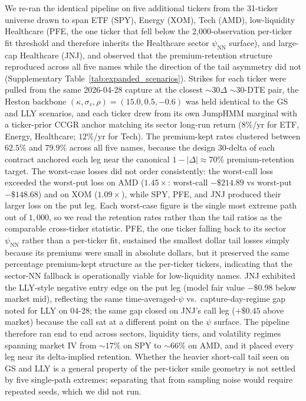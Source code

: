 We re-ran the identical pipeline on five additional tickers from the 31-ticker universe drawn to span ETF (SPY), Energy (XOM), Tech (AMD), low-liquidity Healthcare (PFE, the one ticker that fell below the 2{,}000-observation per-ticker fit threshold and therefore inherits the Healthcare sector $\psi_{\mathrm{NN}}$ surface), and large-cap Healthcare (JNJ), and observed that the premium-retention structure reproduced across all five names while the direction of the tail asymmetry did not (Supplementary Table~\ref{tab:expanded_scenarios}). Strikes for each ticker were pulled from the same 2026-04-28 capture at the closest $\sim 30\Delta$ $\sim$30-DTE pair, the Heston backbone $(\kappa, \sigma_v, \rho) = (15.0, 0.5, -0.6)$ was held identical to the GS and LLY scenarios, and each ticker drew from its own JumpHMM marginal with a ticker-prior CCGR anchor matching its sector long-run return ($8\%$/yr for ETF, Energy, Healthcare; $12\%$/yr for Tech). The premium-kept rates clustered between $62.5\%$ and $79.9\%$ across all five names, because the design 30-delta of each contract anchored each leg near the canonical $1 - |\Delta| \approx 70\%$ premium-retention target. The worst-case losses did not order consistently: the worst-call loss exceeded the worst-put loss on AMD ($1.45{\times}$: worst-call $-\$214.89$ vs worst-put $-\$148.68$) and on XOM ($1.09{\times}$), while SPY, PFE, and JNJ produced their larger loss on the put leg. Each worst-case figure is the single most extreme path out of $1{,}000$, so we read the retention rates rather than the tail ratios as the comparable cross-ticker statistic. PFE, the one ticker falling back to its sector $\psi_{\mathrm{NN}}$ rather than a per-ticker fit, sustained the smallest dollar tail losses simply because its premiums were small in absolute dollars, but it preserved the same percentage premium-kept structure as the per-ticker tickers, indicating that the sector-NN fallback is operationally viable for low-liquidity names. JNJ exhibited the LLY-style negative entry edge on the put leg (model fair value $-\$0.98$ below market mid), reflecting the same time-averaged-$\psi$ vs.\ capture-day-regime gap noted for LLY on 04-28; the same gap closed on JNJ's call leg ($+\$0.45$ above market) because the call sat at a different point on the $\psi$ surface. The pipeline therefore ran end to end across sectors, liquidity tiers, and volatility regimes spanning market IV from $\sim 17\%$ on SPY to $\sim 66\%$ on AMD, and it placed every leg near its delta-implied retention. Whether the heavier short-call tail seen on GS and LLY is a general property of the per-ticker smile geometry is not settled by five single-path extremes; separating that from sampling noise would require repeated seeds, which we did not run.

